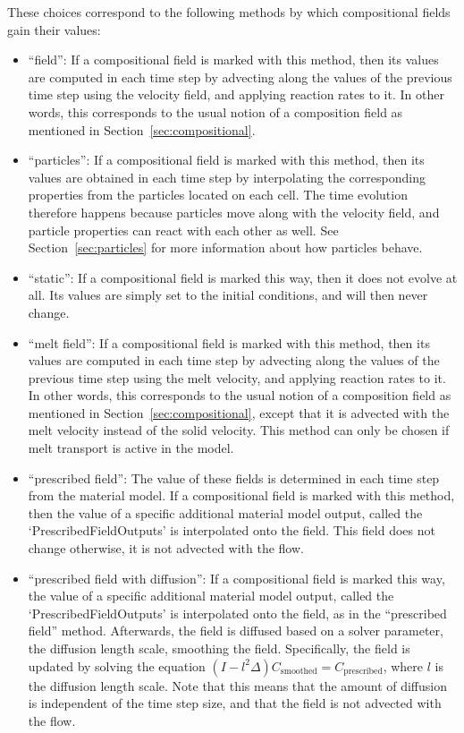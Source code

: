 \begin{itemize}
These choices correspond to the following methods by which compositional fields gain their values:\begin{itemize}\item ``field'': If a compositional field is marked with this method, then its values are computed in each time step by advecting along the values of the previous time step using the velocity field, and applying reaction rates to it. In other words, this corresponds to the usual notion of a composition field as mentioned in Section~\ref{sec:compositional}. 
\item ``particles'': If a compositional field is marked with this method, then its values are obtained in each time step by interpolating the corresponding properties from the particles located on each cell. The time evolution therefore happens because particles move along with the velocity field, and particle properties can react with each other as well. See Section~\ref{sec:particles} for more information about how particles behave.
\item ``static'': If a compositional field is marked this way, then it does not evolve at all. Its values are simply set to the initial conditions, and will then never change.
\item ``melt field'': If a compositional field is marked with this method, then its values are computed in each time step by advecting along the values of the previous time step using the melt velocity, and applying reaction rates to it. In other words, this corresponds to the usual notion of a composition field as mentioned in Section~\ref{sec:compositional}, except that it is advected with the melt velocity instead of the solid velocity. This method can only be chosen if melt transport is active in the model.
\item ``prescribed field'': The value of these fields is determined in each time step from the material model. If a compositional field is marked with this method, then the value of a specific additional material model output, called the `PrescribedFieldOutputs' is interpolated onto the field. This field does not change otherwise, it is not advected with the flow.
\item ``prescribed field with diffusion'': If a compositional field is marked this way, the value of a specific additional material model output, called the `PrescribedFieldOutputs' is interpolated onto the field, as in the ``prescribed field'' method. Afterwards, the field is diffused based on a solver parameter, the diffusion length scale, smoothing the field. Specifically, the field is updated by solving the equation $(I-l^2 \Delta) C_\text{smoothed} = C_\text{prescribed}$, where $l$ is the diffusion length scale. Note that this means that the amount of diffusion is independent of the time step size, and that the field is not advected with the flow.\end{itemize}



\end{itemize}
